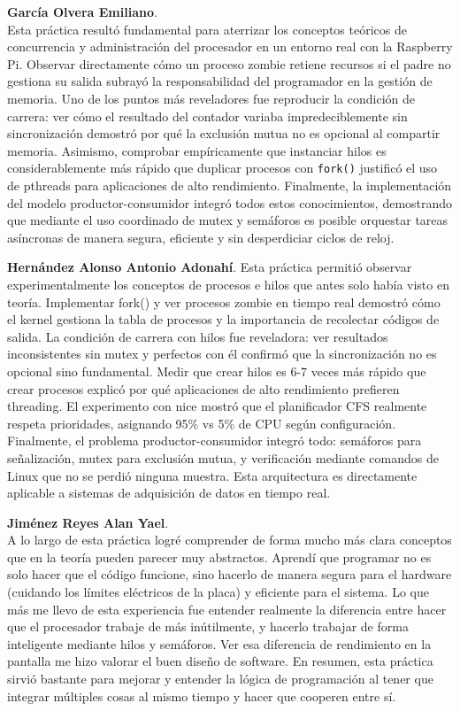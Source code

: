 \documentclass[conference]{IEEEtran}
\begin{document}
\textbf{García Olvera Emiliano}. \\
Esta práctica resultó fundamental para aterrizar los conceptos teóricos de concurrencia y administración del procesador en un entorno real con la Raspberry Pi. Observar directamente cómo un proceso zombie retiene recursos si el padre no gestiona su salida subrayó la responsabilidad del programador en la gestión de memoria. Uno de los puntos más reveladores fue reproducir la condición de carrera: ver cómo el resultado del contador variaba impredeciblemente sin sincronización demostró por qué la exclusión mutua no es opcional al compartir memoria. Asimismo, comprobar empíricamente que instanciar hilos es considerablemente más rápido que duplicar procesos con \texttt{fork()} justificó el uso de pthreads para aplicaciones de alto rendimiento. Finalmente, la implementación del modelo productor-consumidor integró todos estos conocimientos, demostrando que mediante el uso coordinado de mutex y semáforos es posible orquestar tareas asíncronas de manera segura, eficiente y sin desperdiciar ciclos de reloj.

\textbf{Hernández Alonso Antonio Adonahí}. Esta práctica permitió observar experimentalmente los conceptos de procesos e hilos que antes solo había visto en teoría. Implementar fork() y ver procesos zombie en tiempo real demostró cómo el kernel gestiona la tabla de procesos y la importancia de recolectar códigos de salida. La condición de carrera con hilos fue reveladora: ver resultados inconsistentes sin mutex y perfectos con él confirmó que la sincronización no es opcional sino fundamental. Medir que crear hilos es 6-7 veces más rápido que crear procesos explicó por qué aplicaciones de alto rendimiento prefieren threading. El experimento con nice mostró que el planificador CFS realmente respeta prioridades, asignando 95\% vs 5\% de CPU según configuración. Finalmente, el problema productor-consumidor integró todo: semáforos para señalización, mutex para exclusión mutua, y verificación mediante comandos de Linux que no se perdió ninguna muestra. Esta arquitectura es directamente aplicable a sistemas de adquisición de datos en tiempo real.

\textbf{Jiménez Reyes Alan Yael}. \\
A lo largo de esta práctica logré comprender de forma mucho más clara conceptos que en la teoría pueden parecer muy abstractos. Aprendí que programar no es solo hacer que el código funcione, sino hacerlo de manera segura para el hardware (cuidando los límites eléctricos de la placa) y eficiente para el sistema. Lo que más me llevo de esta experiencia fue entender realmente la diferencia entre hacer que el procesador trabaje de más inútilmente, y hacerlo trabajar de forma inteligente mediante hilos y semáforos. Ver esa diferencia de rendimiento en la pantalla me hizo valorar el buen diseño de software. En resumen, esta práctica sirvió bastante para mejorar y entender la lógica de programación al tener que integrar múltiples cosas al mismo tiempo y hacer que cooperen entre sí.
\end{document}

